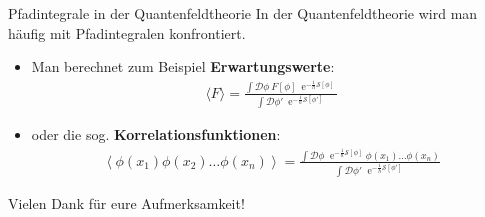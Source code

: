 \begin{frame}{Pfadintegrale in der Quantenfeldtheorie}
In der Quantenfeldtheorie wird man häufig mit Pfadintegralen konfrontiert. \\
\begin{itemize}
	\item Man berechnet zum Beispiel \textbf{Erwartungswerte}:
\begin{align*}
	\langle F \rangle = \frac{\int\mathcal{D}\phi \ F[\phi]\ \operatorname{e}^{-\frac{1}{\hbar}\mathcal{S}[\phi]}}{\int\mathcal{D}\phi' \ \operatorname{e}^{-\frac{1}{\hbar}\mathcal{S}[\phi']}}
\end{align*}
\item oder die sog. \textbf{Korrelationsfunktionen}:
\begin{align*}
\left\langle \phi(x_1) \phi(x_2) \ldots \phi(x_n)\right\rangle
=\frac{\int \mathcal D \phi \; \operatorname{e}^{-\frac{1}{\hbar}\mathcal{S}[\phi]}\phi(x_1)\ldots \phi(x_n)}{\int \mathcal D \phi' \; \operatorname{e}^{-\frac{1}{\hbar}\mathcal{S}[\phi']}}
\end{align*}
\end{itemize}
\end{frame}

\begin{frame}
\begin{block}{\hfill \Large Vielen Dank für eure Aufmerksamkeit! \hfill}
	
\end{block}

\end{frame}